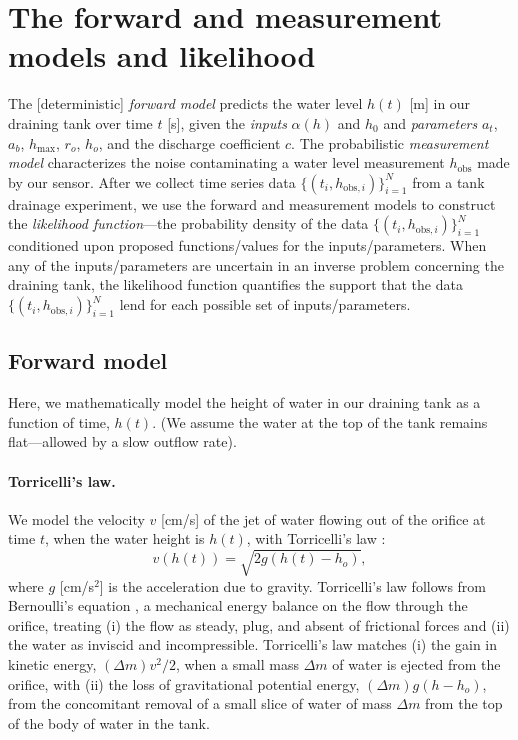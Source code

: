 \documentclass[openacc]{rsproca_new}%
\newcommand\thedata {$\{(t_i,h_{\text{obs}, i})\}_{i=1}^{N}$\xspace}
\begin{document}
\section{The forward and measurement models and likelihood} \label{sec:forward_model}
The [deterministic] \emph{forward model} predicts the water level $h(t)$ [m] in our draining tank over time $t$ [s], given the \emph{inputs} $\alpha(h)$ and $h_0$ and \emph{parameters} $a_t$, $a_b$, $h_{\text{max}}$, $r_o$, $h_o$, and the discharge coefficient $c$. 
The probabilistic \emph{measurement model} characterizes the noise contaminating a water level measurement $h_{\text{obs}}$ made by our sensor.
After we collect time series data \thedata from a tank drainage experiment, we use the forward and measurement models to construct the \emph{likelihood function}---the probability density of the data \thedata conditioned upon proposed functions/values for the inputs/parameters. 
When any of the inputs/parameters are uncertain in an inverse problem concerning the draining tank, the likelihood function quantifies the support that the data \thedata lend for each possible set of inputs/parameters.

\subsection{Forward model}
Here, we mathematically model the height of water in our draining tank as a function of time, $h(t)$. (We assume the water at the top of the tank remains flat---allowed by a slow outflow rate). 

\paragraph{Torricelli's law.}
We model the velocity $v$ [cm/s] of the jet of water flowing out of the orifice at time $t$, when the water height is $h(t)$, with Torricelli's law \cite{d2021torricelli}:
\begin{equation}
	v(h(t)) =  \sqrt{2 g(h(t)-h_o)}, \label{eq:Torricelli}
\end{equation} where $g$ [cm/s$^2$] is the acceleration due to gravity. Torricelli's law follows from Bernoulli's equation \cite{welty2020fundamentals}, a mechanical energy balance on the flow through the orifice, treating (i) the flow as steady, plug, and absent of frictional forces and (ii) the water as inviscid and incompressible.
Torricelli's law matches (i) the gain in kinetic energy, $(\Delta m) v^2/2$, when a small mass $\Delta m$ of water is ejected from the orifice, with (ii) the loss of gravitational potential energy, $(\Delta m)g(h-h_o)$, from the concomitant removal of a small slice of water of mass $\Delta m$ from the top of the body of water in the tank. \cite{groetsch1993inverse,driver1998torricelli,williams2021vessel}
\end{document}
